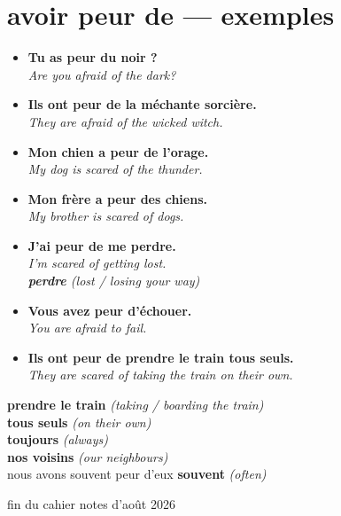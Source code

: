 \documentclass[11pt,a4paper]{article}
\newcommand{\pair}[2]{%
  \item \textbf{#1}\\
  {\color{noteblue}\textit{#2}}%
}
\newcommand{\vocab}[2]{%
  \textbf{#1} {\color{noteblue}\textit{(#2)}}%
}
\begin{document}
\newpage

\section*{avoir peur de --- exemples}

\begin{exbox}
\begin{itemize}[leftmargin=1.2em,itemsep=0.55em]
  \pair{Tu as peur du noir ?}
       {Are you afraid of the dark?}
  \pair{Ils ont peur de la m\'{e}chante sorci\`{e}re.}
       {They are afraid of the wicked witch.}
  \pair{Mon chien a peur de l'orage.}
       {My dog is scared of the thunder.}
  \pair{Mon fr\`{e}re a peur des chiens.}
       {My brother is scared of dogs.}
  \pair{J'ai peur de me perdre.}
       {I'm scared of getting lost.\\
        \vocab{perdre}{lost / losing your way}}
\end{itemize}
\end{exbox}

\vspace{0.4em}

\begin{exbox}
\begin{itemize}[leftmargin=1.2em,itemsep=0.55em]
  \pair{Vous avez peur d'\'{e}chouer.}
       {You are afraid to fail.}
  \pair{Ils ont peur de prendre le train tous seuls.}
       {They are scared of taking the train on their own.}
\end{itemize}
\end{exbox}

\begin{enbox}
\vocab{prendre le train}{taking / boarding the train}\\[0.25em]
\vocab{tous seuls}{on their own}\\[0.25em]
\vocab{toujours}{always}\\[0.25em]
\vocab{nos voisins}{our neighbours}\\[0.25em]
nous avons souvent peur d'eux \quad \vocab{souvent}{often}
\end{enbox}

\vspace{1.2em}

\begin{center}
{\color{plum}\small fin du cahier \textbullet{} notes d'ao\^{u}t 2026}
\end{center}
\end{document}
